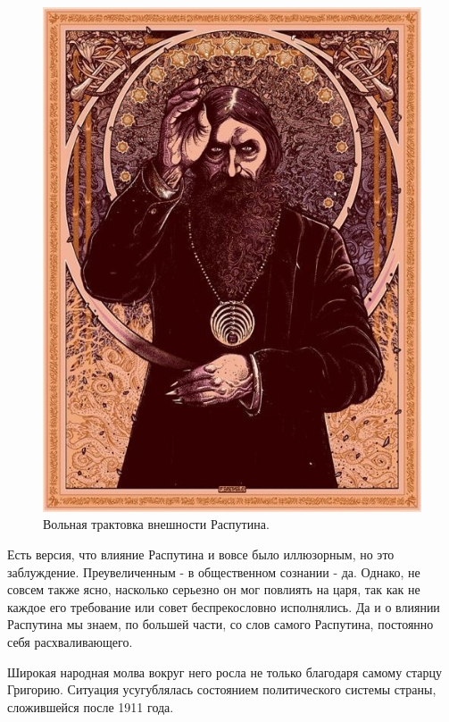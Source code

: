 \begin{figure}[h!tb] 
	\centering\includegraphics[scale=0.3]{Data/Rasputinschina/sUranFzq1iQ.jpg}
	\caption{Вольная трактовка внешности Распутина.}%
\end{figure}

Есть версия, что влияние Распутина и вовсе было иллюзорным, но это заблуждение. Преувеличенным - в общественном сознании - да. Однако, не совсем также ясно, насколько серьезно он мог повлиять на царя, так как не каждое его требование или совет беспрекословно исполнялись. Да и о влиянии Распутина мы знаем, по большей части, со слов самого Распутина, постоянно себя расхваливающего.

Широкая народная молва вокруг него росла не только благодаря самому старцу Григорию. Ситуация усугублялась состоянием политического системы страны, сложившейся после 1911 года.

